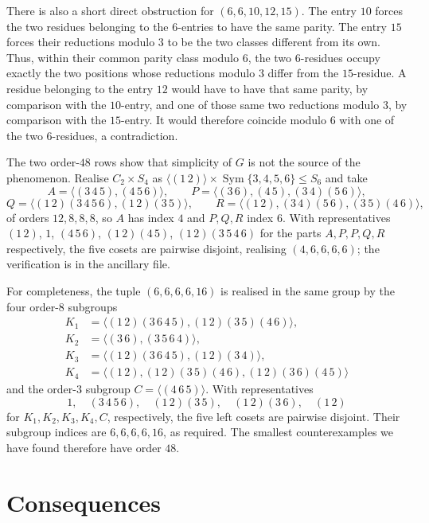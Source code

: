 \documentclass[12pt]{article}
\theoremstyle{remark}
\begin{document}
There is also a short direct obstruction for $(6,6,10,12,15)$. The entry $10$ forces the two residues belonging to the $6$-entries to have the same parity. The entry $15$ forces their reductions modulo $3$ to be the two classes different from its own. Thus, within their common parity class modulo $6$, the two $6$-residues occupy exactly the two positions whose reductions modulo $3$ differ from the $15$-residue. A residue belonging to the entry $12$ would have to have that same parity, by comparison with the $10$-entry, and one of those same two reductions modulo $3$, by comparison with the $15$-entry. It would therefore coincide modulo $6$ with one of the two $6$-residues, a contradiction.

The two order-$48$ rows show that simplicity of $G$ is not the source of the phenomenon. Realise $C_2\times S_4$ as $\langle(1\,2)\rangle\times\operatorname{Sym}\{3,4,5,6\}\le S_6$ and take
\[
A=\langle(3\,4\,5),(4\,5\,6)\rangle,\qquad P=\langle(3\,6),(4\,5),(3\,4)(5\,6)\rangle,
\]
\[
Q=\langle(1\,2)(3\,4\,5\,6),(1\,2)(3\,5)\rangle,\qquad R=\langle(1\,2),(3\,4)(5\,6),(3\,5)(4\,6)\rangle,
\]
of orders $12,8,8,8$, so $A$ has index $4$ and $P,Q,R$ index $6$. With representatives $(1\,2)$, $1$, $(4\,5\,6)$, $(1\,2)(4\,5)$, $(1\,2)(3\,5\,4\,6)$ for the parts $A,P,P,Q,R$ respectively, the five cosets are pairwise disjoint, realising $(4,6,6,6,6)$; the verification is in the ancillary file.

For completeness, the tuple $(6,6,6,6,16)$ is realised in the same group by the four order-$8$ subgroups
\[
\begin{aligned}
K_1&=\langle(1\,2)(3\,6\,4\,5),(1\,2)(3\,5)(4\,6)\rangle,\\
K_2&=\langle(3\,6),(3\,5\,6\,4)\rangle,\\
K_3&=\langle(1\,2)(3\,6\,4\,5),(1\,2)(3\,4)\rangle,\\
K_4&=\langle(1\,2),(1\,2)(3\,5)(4\,6),(1\,2)(3\,6)(4\,5)\rangle
\end{aligned}
\]
and the order-$3$ subgroup $C=\langle(4\,6\,5)\rangle$. With representatives
\[
1,\quad (3\,4\,5\,6),\quad (1\,2)(3\,5),\quad
(1\,2)(3\,6),\quad (1\,2)
\]
for $K_1,K_2,K_3,K_4,C$, respectively, the five left cosets are pairwise disjoint. Their subgroup indices are $6,6,6,6,16$, as required. The smallest counterexamples we have found therefore have order $48$.

\section{Consequences}\label{sec:consequences}
\end{document}

